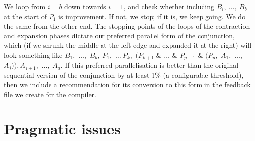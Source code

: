 We loop from $i=b$ down towards $i=1$, and check whether
including $B_i,~\ldots,~B_b$ at the start of $P_1$ is improvement.
If not, we stop; if it is, we keep going.
We do the same from the other end.
The stopping points of the loops of the contraction and expansion phases
dictate our preferred parallel form of the conjunction, which
(if we shrunk the middle at the left edge and expanded it at the right)
will look something like
$B_1,$ $\ldots,$ $B_{b},$ $P_1,$ $\ldots~P_k,$
$(P_{k+1}$ $\&$ $\ldots$ $\&$ $P_{p-1}$ $\&$ $(P_p,$ $A_1,$ $\ldots,$ $A_j)),
A_{j+1},$ $\ldots,$ $A_a$.
If this preferred parallelisation is better than
the original sequential version of the conjunction by at least 1\% (a
configurable threshold),
then we include a recommendation for its conversion to this form
in the feedback file we create for the compiler.



\section{Pragmatic issues}
\label{sec:overlap_pragmatic}

